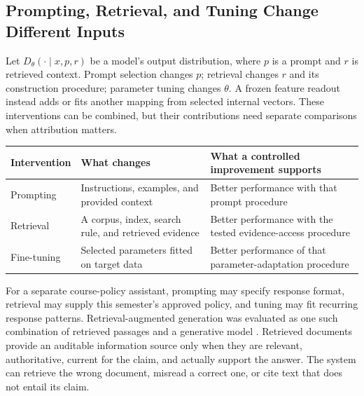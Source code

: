 \subsection{Prompting, Retrieval, and Tuning Change Different Inputs}

Let $D_\theta(\cdot\mid x,p,r)$ be a model's output distribution, where $p$ is a prompt and $r$ is retrieved context. Prompt selection changes $p$; retrieval changes $r$ and its construction procedure; parameter tuning changes $\theta$. A frozen feature readout instead adds or fits another mapping from selected internal vectors. These interventions can be combined, but their contributions need separate comparisons when attribution matters.

\par\addvspace{\intextsep}\noindent\begin{minipage}{\linewidth}
\centering\small
\begin{tabular}{@{}L{2.0cm}L{3.65cm}L{4.45cm}@{}}
\toprule
Intervention & What changes & What a controlled improvement supports \\
\midrule
Prompting & Instructions, examples, and provided context & Better performance with that prompt procedure \\
Retrieval & A corpus, index, search rule, and retrieved evidence & Better performance with the tested evidence-access procedure \\
Fine-tuning & Selected parameters fitted on target data & Better performance of that parameter-adaptation procedure \\
\bottomrule
\end{tabular}
\label{tab:prompt-retrieve-finetune}
\end{minipage}\par\addvspace{\intextsep}

For a separate course-policy assistant, prompting may specify response format, retrieval may supply this semester's approved policy, and tuning may fit recurring response patterns. Retrieval-augmented generation was evaluated as one such combination of retrieved passages and a generative model \citep{lewis2020rag}. Retrieved documents provide an auditable information source only when they are relevant, authoritative, current for the claim, and actually support the answer. The system can retrieve the wrong document, misread a correct one, or cite text that does not entail its claim.

